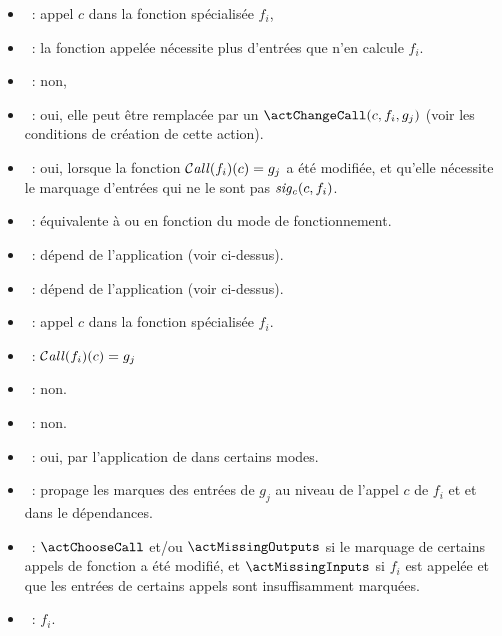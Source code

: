 \begin{itemize}
  \item \param~: 
    appel $c$ dans la fonction spécialisée $f_i$,
  \item \precond~: la fonction appelée nécessite plus d'entrées que n'en calcule
    $f_i$.
  \item \creable~: 
    non,
  \item \modifiable~: 
    oui, elle peut être remplacée par un $\actChangeCall(c, f_i, g_j)$ (voir les
    conditions de création de cette action).
  \item \generable~: 
    oui, lorsque la fonction $\operatorname{\mathcal{C\mathit{all}}}(f_i)(c) = g_j$ a été modifiée, et qu'elle
    nécessite le marquage d'entrées qui ne le sont pas $\mathit{sig_c}(c,f_i)$.
  \item \application~: équivalente à \actModifCallInputs{} ou \actChooseCall{}
    en fonction du mode de fonctionnement.
  \item \genere~: dépend de l'application (voir ci-dessus).
  \item \modifie~: dépend de l'application (voir ci-dessus).
\end{itemize}



\begin{itemize}
  \item \param~: appel $c$ dans la fonction spécialisée $f_i$.
  \item \precond~: $\operatorname{\mathcal{C\mathit{all}}}(f_i)(c) = g_j$
  \item \creable~: non.
  \item \modifiable~: non.
  \item \generable~: oui, par l'application de \actMissingInputs{} dans certains
    modes.
  \item \application~: propage les marques des entrées de $g_j$ au niveau de
    l'appel $c$ de $f_i$ et et dans le dépendances.
  \item \genere~: 
    $\actChooseCall$ et/ou $\actMissingOutputs$ si le marquage de
    certains appels de fonction a été modifié, et $\actMissingInputs$ si
    $f_i$ est appelée et que les entrées de certains appels sont insuffisamment
    marquées.
  \item \modifie~: $f_i$.
\end{itemize}


